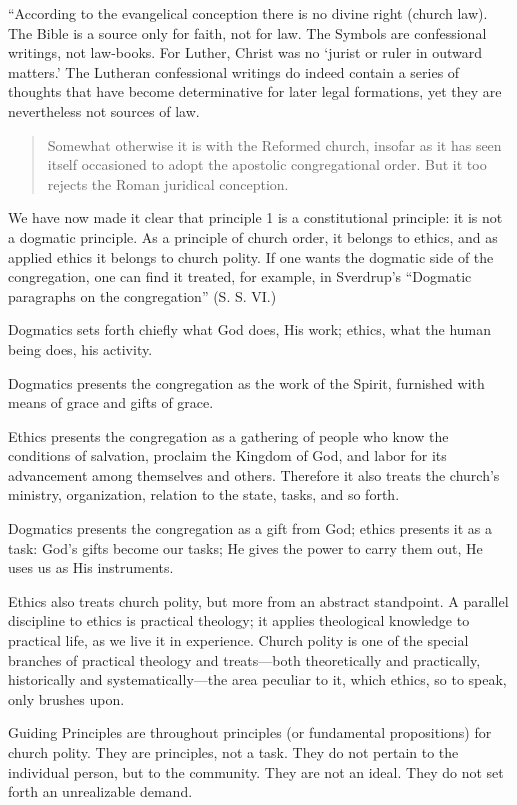 “According to the evangelical conception there is no divine right (church law). The Bible is a source only for faith, not for law. The Symbols are confessional writings, not law-books. For Luther, Christ was no ‘jurist or ruler in outward matters.’ The Lutheran confessional writings do indeed contain a series of thoughts that have become determinative for later legal formations, yet they are nevertheless not sources of law.

\begin{quote}
Somewhat otherwise it is with the Reformed church, insofar as it has seen itself occasioned to adopt the apostolic congregational order. But it too rejects the Roman juridical conception.
\end{quote}

We have now made it clear that principle 1 is a constitutional principle: it is not a dogmatic principle. As a principle of church order, it belongs to ethics, and as applied ethics it belongs to church polity. If one wants the dogmatic side of the congregation, one can find it treated, for example, in Sverdrup’s “Dogmatic paragraphs on the congregation” (S. S. VI.)

Dogmatics sets forth chiefly what God does, His work; ethics, what the human being does, his activity.

Dogmatics presents the congregation as the work of the Spirit, furnished with means of grace and gifts of grace.

Ethics presents the congregation as a gathering of people who know the conditions of salvation, proclaim the Kingdom of God, and labor for its advancement among themselves and others. Therefore it also treats the church’s ministry, organization, relation to the state, tasks, and so forth.

Dogmatics presents the congregation as a gift from God; ethics presents it as a task: God’s gifts become our tasks; He gives the power to carry them out, He uses us as His instruments.

Ethics also treats church polity, but more from an abstract standpoint. A parallel discipline to ethics is practical theology; it applies theological knowledge to practical life, as we live it in experience. Church polity is one of the special branches of practical theology and treats—both theoretically and practically, historically and systematically—the area peculiar to it, which ethics, so to speak, only brushes upon.

Guiding Principles are throughout principles (or fundamental propositions) for church polity. They are principles, not a task. They do not pertain to the individual person, but to the community. They are not an ideal. They do not set forth an unrealizable demand.

